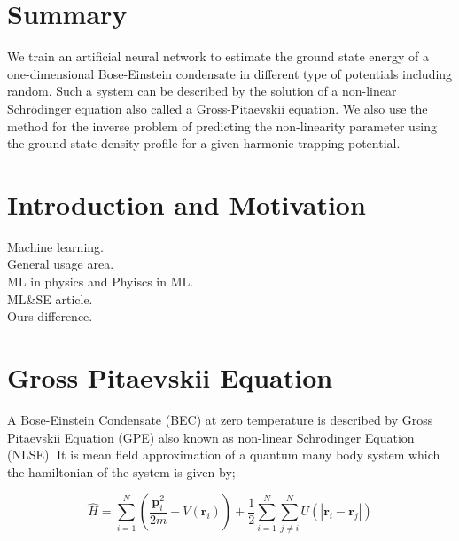 \documentclass[a4paper,times,hidelinks,12pt]{article}
\begin{document}
\setcounter{page}{1}

\section*{Summary}

We train an artificial neural network to estimate the ground state energy
of a one-dimensional Bose-Einstein condensate in different type of potentials including random.
Such a system can be described by the solution of a non-linear Schr{\"o}dinger equation also called a Gross-Pitaevskii equation. We also use the method for the inverse problem of predicting the non-linearity parameter using the ground
state density profile for a given harmonic trapping potential.

\newpage
\tableofcontents

\newpage

\section{Introduction and Motivation}


\label{sec:Intro}
\noindent Machine learning.\\
General usage area.\\
ML in physics and Phyiscs in ML.\\
ML\&SE article.\\
Ours difference.\\

\section{Gross Pitaevskii Equation}

A Bose-Einstein Condensate (BEC) at zero temperature is described by Gross Pitaevskii Equation (GPE) also known as non-linear Schrodinger Equation (NLSE). It is mean field approximation of a quantum many body system which the hamiltonian of the system is given by;

\begin{equation}
\label{eq:GPE_hamiltonian}
\hat{H} = \sum_{i = 1}^{N} \left(\frac{\boldsymbol{p}_i^2}{2m} + V(\boldsymbol{r}_i) \right) + \frac{1}{2} \sum_{i = 1}^{N} \sum_{j \neq i}^{N} U(|\boldsymbol{r}_i - \boldsymbol{r}_j|)
\end{equation}
\end{document}
